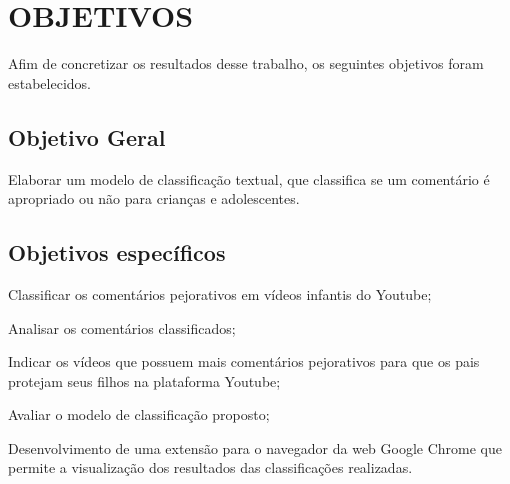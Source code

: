 
\newpage
\section{OBJETIVOS}

Afim de concretizar os resultados desse trabalho, os seguintes objetivos foram estabelecidos.

\subsection{Objetivo Geral}

Elaborar um modelo de classificação textual, que classifica se um comentário é apropriado ou não para crianças e adolescentes.

\begin{comment}
Example inline comment
\end{comment}

\subsection{Objetivos específicos}

\begin{alineas}
    
    \item Classificar os comentários pejorativos em vídeos infantis do Youtube;
    \item Analisar os comentários classificados;
    \item Indicar os vídeos que possuem mais comentários pejorativos para que os pais protejam seus filhos na plataforma Youtube; 
    \item Avaliar o modelo de classificação proposto;
    \item Desenvolvimento de uma extensão para o navegador da web Google Chrome que permite a visualização dos resultados das classificações realizadas.
    
\end{alineas}
